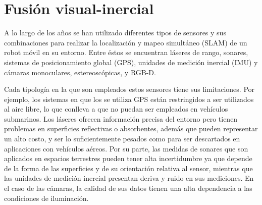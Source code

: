
\section{Fusión visual-inercial }
A lo largo de los años se han utilizado diferentes tipos de sensores y sus combinaciones para realizar la localización y mapeo simultáneo (SLAM) de un robot móvil en su entorno. Entre éstos se encuentran láseres de rango, sonares, sistemas de posicionamiento global (GPS), unidades de medición inercial (IMU) y cámaras monoculares, estereoscópicas, y RGB-D.

Cada tipología en la que son empleados estos sensores tiene sus limitaciones. Por ejemplo, los sistemas en que los se utiliza GPS están restringidos a ser utilizados al aire libre, lo que conlleva a que no puedan ser empleados en vehículos submarinos. Los láseres ofrecen información precisa del entorno pero tienen problemas en superficies reflectivas o absorbentes, además que pueden representar un alto costo,  y  ser lo suficientemente pesados como para ser descartados en aplicaciones con  vehículos aéreos. Por su parte, las medidas de sonares que son aplicados en espacios terrestres pueden tener alta incertidumbre ya que depende de la forma de las superficies y de su orientación relativa al sensor, mientras que las unidades de medición inercial presentan deriva y ruido en sus mediciones. En el caso de las cámaras, la  calidad de sus datos tienen una alta dependencia a las condiciones de iluminación. 

